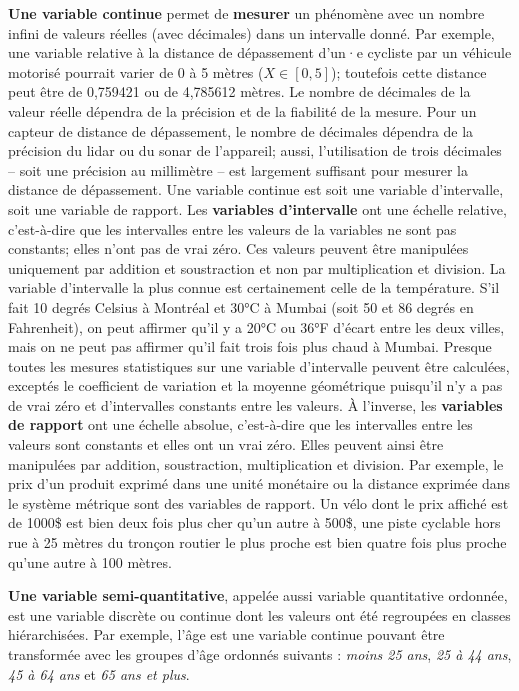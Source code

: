 \documentclass[
  11pt,
  french,
]{book}
\begin{document}
\textbf{Une variable continue} permet de \textbf{mesurer} un phénomène avec un nombre infini de valeurs réelles (avec décimales) dans un intervalle donné. Par exemple, une variable relative à la distance de dépassement d'un·e cycliste par un véhicule motorisé pourrait varier de 0 à 5 mètres (\(X \in \left[0,5\right]\)); toutefois cette distance peut être de 0,759421 ou de 4,785612 mètres. Le nombre de décimales de la valeur réelle dépendra de la précision et de la fiabilité de la mesure. Pour un capteur de distance de dépassement, le nombre de décimales dépendra de la précision du lidar ou du sonar de l'appareil; aussi, l'utilisation de trois décimales -- soit une précision au millimètre -- est largement suffisant pour mesurer la distance de dépassement. Une variable continue est soit une variable d'intervalle, soit une variable de rapport. Les \textbf{variables d'intervalle} ont une échelle relative, c'est-à-dire que les intervalles entre les valeurs de la variables ne sont pas constants; elles n'ont pas de vrai zéro. Ces valeurs peuvent être manipulées uniquement par addition et soustraction et non par multiplication et division. La variable d'intervalle la plus connue est certainement celle de la température. S'il fait 10 degrés Celsius à Montréal et 30°C à Mumbai (soit 50 et 86 degrés en Fahrenheit), on peut affirmer qu'il y a 20°C ou 36°F d'écart entre les deux villes, mais on ne peut pas affirmer qu'il fait trois fois plus chaud à Mumbai. Presque toutes les mesures statistiques sur une variable d'intervalle peuvent être calculées, exceptés le coefficient de variation et la moyenne géométrique puisqu'il n'y a pas de vrai zéro et d'intervalles constants entre les valeurs. À l'inverse, les \textbf{variables de rapport} ont une échelle absolue, c'est-à-dire que les intervalles entre les valeurs sont constants et elles ont un vrai zéro. Elles peuvent ainsi être manipulées par addition, soustraction, multiplication et division. Par exemple, le prix d'un produit exprimé dans une unité monétaire ou la distance exprimée dans le système métrique sont des variables de rapport. Un vélo dont le prix affiché est de 1000\$ est bien deux fois plus cher qu'un autre à 500\$, une piste cyclable hors rue à 25 mètres du tronçon routier le plus proche est bien quatre fois plus proche qu'une autre à 100 mètres.

\textbf{Une variable semi-quantitative}, appelée aussi variable quantitative ordonnée, est une variable discrète ou continue dont les valeurs ont été regroupées en classes hiérarchisées. Par exemple, l'âge est une variable continue pouvant être transformée avec les groupes d'âge ordonnés suivants : \emph{moins 25 ans}, \emph{25 à 44 ans}, \emph{45 à 64 ans} et \emph{65 ans et plus}.
\end{document}
